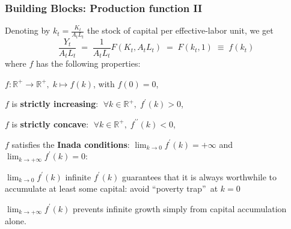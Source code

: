 \documentclass[xcolor=x11names,compress,aspectratio=169]{beamer}%
\makeatletter
\renewenvironment{itemize}{\begin{compactitemize}[<+-| alert@+>]}{\end{compactitemize}}
\makeatother
\begin{document}
\begin{frame}%
%

\frametitle{Building Blocks: Production function II}%


Denoting by $k_{t}=\tfrac{K_{t}}{A_{t}L_{t}}$ the stock of capital per
effective-labor unit, we get
\[
\frac{Y_{t}}{A_{t}L_{t}}\;=\;\frac{1}{A_{t}L_{t}}F(K_{t},A_{t}L_{t}%
)\;=\;F(k_{t},1)\;\equiv\;f(k_{t})
\]
\medskip where $f$ has the following properties:

\begin{enumerate}
\item $f:\mathbb{R}^{+}\rightarrow\mathbb{R}^{+},\;k\mapsto f(k)$, with
$f(0)=0$,

\item $f$ is \textbf{strictly increasing}: $\;\forall k\in\mathbb{R}%
^{+},\;f^{\prime}(k)>0$,

\item $f$ is \textbf{strictly concave}: $\;\forall k\in\mathbb{R}%
^{+},\;f^{\prime\prime}(k)<0$,

\item $f$ satisfies the \textbf{Inada conditions}: $\lim_{k\rightarrow
0}f^{\prime}(k)=+\infty$ and $\lim_{k\rightarrow+\infty}f^{\prime}(k)=0$:

\begin{itemize}
\item $\lim_{k\rightarrow0}f^{\prime}(k)$ infinite $f^{\prime}(k)$ guarantees
that it is always worthwhile to accumulate at least some capital: avoid
\textquotedblleft poverty trap\textquotedblright\ at $k=0$

\item $\lim_{k\rightarrow+\infty}f^{\prime}(k)$ prevents infinite growth
simply from capital accumulation alone.
\end{itemize}
\end{enumerate}

%

\transboxout
\end{frame}%
%
\end{document}
